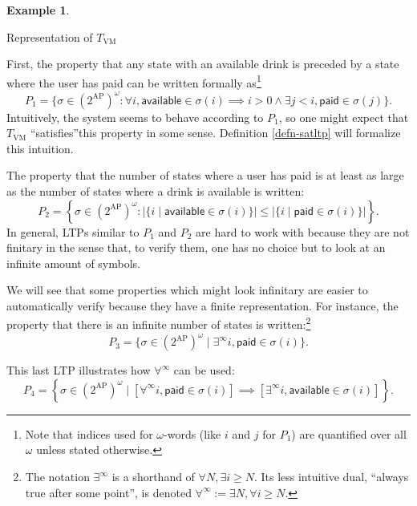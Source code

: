 \documentclass{tufte-handout} %
\theoremstyle{definition}
\newtheorem{exmp}[thm]{Example}
\theoremstyle{remark}
\newcommand{\0}{\textsf{0}}
\newcommand{\1}{\textsf{1}}
\newcommand{\AP}{\text{AP}}
\begin{document}
\begin{exmp}
\begin{marginfigure}
\begin{center}
		\end{center}
		\caption{Representation of $T_{\text{VM}}$}\label{fig-vmagain}
	\end{marginfigure}
	First, the property that any state with an available drink is preceded by a state where the user has paid can be written formally as\footnote{Note that indices used for $\omega$-words (like $i$ and $j$ for $P_1$) are quantified over all $\omega$ unless stated otherwise.} \[P_1 = \{\sigma \in (2^{\AP})^{\omega} : \forall i, \textsf{available} \in \sigma(i) \implies i>0 \wedge \exists j<i, \textsf{paid} \in \sigma(j)\}.\]
	Intuitively, the system seems to behave according to $P_1$, so one might expect that $T_{\text{VM}}$ \textquotedblleft satisfies\textquotedblright this property in some sense. Definition \ref{defn-satltp} will formalize this intuition.
	
	The property that the number of states where a user has paid is at least as large as the number of states where a drink is available is written: \[P_2 = \left\{\sigma \in(2^{\AP})^{\omega} :\left|\{i \mid \textsf{available} \in \sigma(i)\}\right| \leq \left|\{i \mid \textsf{paid} \in \sigma(i)\}\right| \right\}.\]
	In general, LTPs similar to $P_1$ and $P_2$ are hard to work with because they are not finitary in the sense that, to verify them, one has no choice but to look at an infinite amount of symbols.%

	We will see that some properties which might look infinitary are easier to automatically verify because they have a finite representation. For instance, the property that there is an infinite number of states is written:\footnote{The notation $\exists^{\infty}$ is a shorthand of  $\forall N, \exists i \geq N$. Its less intuitive dual, \textquotedblleft always true after some point\textquotedblright, is denoted $\forall^{\infty} := \exists N, \forall i\geq N$.}
	\[P_3 = \{ \sigma \in(2^{\AP})^{\omega} \mid \exists^{\infty} i, \textsf{paid} \in \sigma(i)\}.\]
	
	This last LTP illustrates how $\forall^{\infty}$ can be used:
	\[ P_4 = \left\{ \sigma \in(2^{\AP})^{\omega} \mid \left[\forall^{\infty} i, \textsf{paid} \in \sigma(i)\right] \implies \left[\exists^{\infty} i, \textsf{available} \in \sigma(i)\right]\right\}.\]
\end{exmp}
\end{document}

